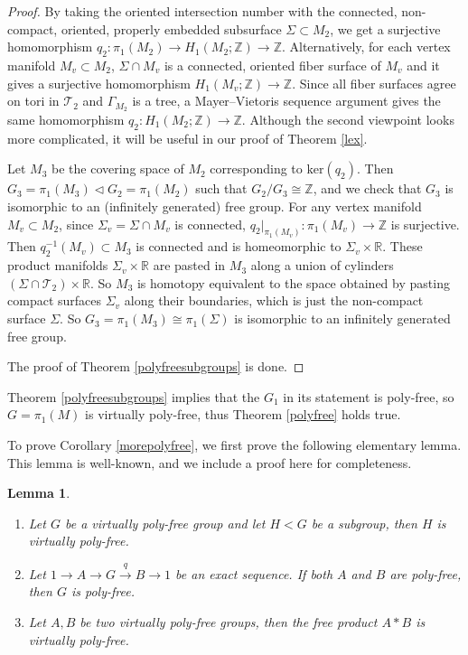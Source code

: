 \documentclass{amsart}
\numberwithin{equation}{section}
\newtheorem{lemma}[theorem]{Lemma}
\theoremstyle{definition}
\begin{document}
\begin{proof}
By taking the oriented intersection number with the connected, non-compact, oriented, properly embedded subsurface $\Sigma\subset M_2$, we get a surjective homomorphism $q_2:\pi_1(M_2)\to H_1(M_2;\mathbb{Z})\to \mathbb{Z}$. Alternatively, for each vertex manifold $M_v\subset M_2$, $\Sigma\cap M_v$ is a connected, oriented fiber surface of $M_v$ and it gives a surjective homomorphism $H_1(M_v;\mathbb{Z})\to \mathbb{Z}$. Since all fiber surfaces agree on tori in $\mathcal{T}_2$ and $\Gamma_{M_2}$ is a tree, a Mayer–Vietoris sequence argument gives the same homomorphism $q_2:H_1(M_2;\mathbb{Z})\to \mathbb{Z}$. Although the second viewpoint looks more complicated, it will be useful in our proof of Theorem \ref{lex}.

Let $M_3$ be the covering space of $M_2$ corresponding to $\text{ker}(q_2)$. Then $G_3=\pi_1(M_3)\vartriangleleft G_2=\pi_1(M_2)$ such that $G_2/G_3\cong \mathbb{Z}$, and we check that $G_3$ is isomorphic to an (infinitely generated) free group. For any vertex manifold $M_v\subset M_2$, since $\Sigma_v = \Sigma \cap M_v$ is connected, $q_2|_{\pi_1(M_v)}:\pi_1(M_v)\to \mathbb{Z}$ is surjective.  Then $q_2^{-1}(M_v)\subset M_3$ is connected and is homeomorphic to $\Sigma_v \times \mathbb{R}$. These product manifolds $\Sigma_v \times \mathbb{R}$ are pasted in $M_3$ along a union of cylinders $(\Sigma \cap \mathcal{T}_2)\times \mathbb{R}$. So $M_3$ is homotopy equivalent to the space obtained by pasting compact surfaces $\Sigma_v$ along their boundaries, which is just the non-compact surface $\Sigma$. So $G_3=\pi_1(M_3)\cong \pi_1(\Sigma)$ is isomorphic to an infinitely generated free group.

The proof of Theorem \ref{polyfreesubgroups} is done.
\end{proof}

Theorem \ref{polyfreesubgroups}  implies that the $G_1$ in its statement is poly-free, so $G=\pi_1(M)$ is virtually poly-free, thus Theorem \ref{polyfree} holds true.

To prove Corollary \ref{morepolyfree}, we first prove the following elementary lemma. This lemma is well-known, and we include a proof here for completeness.


\begin{lemma}\label{polyfreeproperty}
\begin{enumerate}
\item Let $G$ be a virtually poly-free group and let $H<G$ be a subgroup, then $H$ is virtually poly-free.
\item Let $1\to A\to G\xrightarrow{q} B\to 1$ be an exact sequence. If both $A$ and $B$ are poly-free, then $G$ is poly-free.
\item Let $A,B$ be two virtually poly-free groups, then the free product $A*B$ is virtually poly-free. 
\end{enumerate}
\end{lemma}
\end{document}

